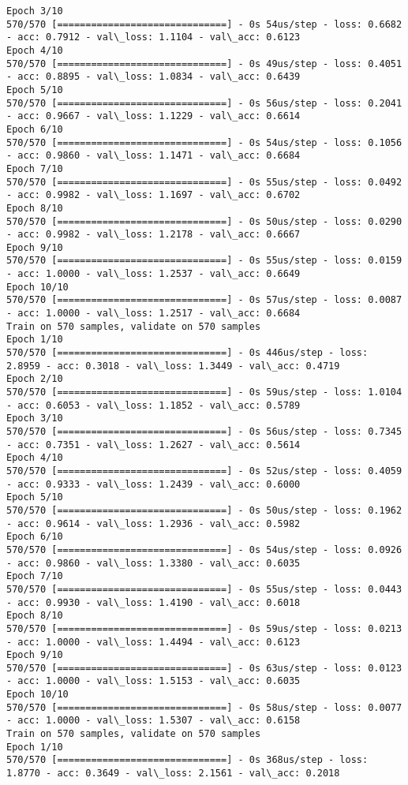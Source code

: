 \documentclass[11pt]{article}
\begin{document}
\begin{Verbatim}[commandchars=\\\{\}]
Epoch 3/10
570/570 [==============================] - 0s 54us/step - loss: 0.6682 - acc: 0.7912 - val\_loss: 1.1104 - val\_acc: 0.6123
Epoch 4/10
570/570 [==============================] - 0s 49us/step - loss: 0.4051 - acc: 0.8895 - val\_loss: 1.0834 - val\_acc: 0.6439
Epoch 5/10
570/570 [==============================] - 0s 56us/step - loss: 0.2041 - acc: 0.9667 - val\_loss: 1.1229 - val\_acc: 0.6614
Epoch 6/10
570/570 [==============================] - 0s 54us/step - loss: 0.1056 - acc: 0.9860 - val\_loss: 1.1471 - val\_acc: 0.6684
Epoch 7/10
570/570 [==============================] - 0s 55us/step - loss: 0.0492 - acc: 0.9982 - val\_loss: 1.1697 - val\_acc: 0.6702
Epoch 8/10
570/570 [==============================] - 0s 50us/step - loss: 0.0290 - acc: 0.9982 - val\_loss: 1.2178 - val\_acc: 0.6667
Epoch 9/10
570/570 [==============================] - 0s 55us/step - loss: 0.0159 - acc: 1.0000 - val\_loss: 1.2537 - val\_acc: 0.6649
Epoch 10/10
570/570 [==============================] - 0s 57us/step - loss: 0.0087 - acc: 1.0000 - val\_loss: 1.2517 - val\_acc: 0.6684
Train on 570 samples, validate on 570 samples
Epoch 1/10
570/570 [==============================] - 0s 446us/step - loss: 2.8959 - acc: 0.3018 - val\_loss: 1.3449 - val\_acc: 0.4719
Epoch 2/10
570/570 [==============================] - 0s 59us/step - loss: 1.0104 - acc: 0.6053 - val\_loss: 1.1852 - val\_acc: 0.5789
Epoch 3/10
570/570 [==============================] - 0s 56us/step - loss: 0.7345 - acc: 0.7351 - val\_loss: 1.2627 - val\_acc: 0.5614
Epoch 4/10
570/570 [==============================] - 0s 52us/step - loss: 0.4059 - acc: 0.9333 - val\_loss: 1.2439 - val\_acc: 0.6000
Epoch 5/10
570/570 [==============================] - 0s 50us/step - loss: 0.1962 - acc: 0.9614 - val\_loss: 1.2936 - val\_acc: 0.5982
Epoch 6/10
570/570 [==============================] - 0s 54us/step - loss: 0.0926 - acc: 0.9860 - val\_loss: 1.3380 - val\_acc: 0.6035
Epoch 7/10
570/570 [==============================] - 0s 55us/step - loss: 0.0443 - acc: 0.9930 - val\_loss: 1.4190 - val\_acc: 0.6018
Epoch 8/10
570/570 [==============================] - 0s 59us/step - loss: 0.0213 - acc: 1.0000 - val\_loss: 1.4494 - val\_acc: 0.6123
Epoch 9/10
570/570 [==============================] - 0s 63us/step - loss: 0.0123 - acc: 1.0000 - val\_loss: 1.5153 - val\_acc: 0.6035
Epoch 10/10
570/570 [==============================] - 0s 58us/step - loss: 0.0077 - acc: 1.0000 - val\_loss: 1.5307 - val\_acc: 0.6158
Train on 570 samples, validate on 570 samples
Epoch 1/10
570/570 [==============================] - 0s 368us/step - loss: 1.8770 - acc: 0.3649 - val\_loss: 2.1561 - val\_acc: 0.2018

\end{Verbatim}
\end{document}
